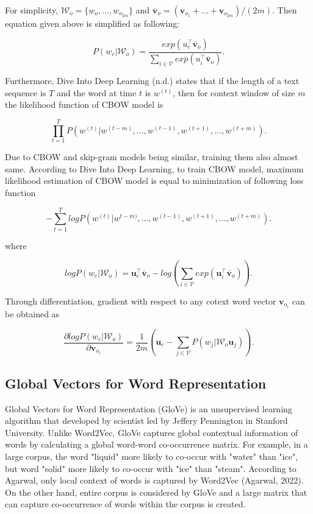 \documentclass[man]{apa7}
\begin{document}
For simplicity, $\mathcal{W}_o = \{ w_o,...,w_{o_{2m}}\}$ and $\bar{\mathbf{v}}_o = (\mathbf{v}_{o_1}+...+\mathbf{v}_{o_{2m}})/(2m)$. Then equation given above is simplified as following:

\begin{equation}
P(w_c | \mathcal{W}_o) = \frac{exp(u_c^\top \bar{\mathbf{v}}_o)}{\sum_{i \in \mathcal{V}} exp(u_i^\top \bar{\mathbf{v}}_o)}.
\end{equation}

Furthermore, Dive Into Deep Learning (n.d.) states that if the length of a text sequence is $\mathit{T}$ and the word at time $t$ is $w^{(t)}$, then for context window of size $m$ the likelihood function of CBOW model is

\begin{equation}
\prod_{t=1}^T P(w^{(t)}| w^{(t-m)},..., w^{(t-1)},w^{(t+1)},...,w^{(t+m)}).
\end{equation}

Due to CBOW and skip-gram models being similar, training them also almost same. According to Dive Into Deep Learning, to train CBOW model, maximum likelihood estimation of CBOW model is equal to minimization of following loss function

\begin{equation}
- \sum_{t=1}^T logP(w^{(t)} | w^{t-m)} ,..., w^{(t-1)} ,w^{(t+1)}, ...,w^{(t+m)}).
\end{equation}

where

\begin{equation}
logP(w_c | \mathcal{W}_o) = \mathbf{u}_c^\top \bar{\mathbf{v}}_o - log(\sum_{i \in \mathcal{V}} exp(\mathbf{u}_i^\top \bar{\mathbf{v}}_o)).
\end{equation}

Through differentiation, gradient with respect to any cotext word vector $\mathbf{v}_{o_i}$ can be obtained as

\begin{equation}
\frac{\partial log P(w_c| \mathcal{W}_o )}{\partial \mathbf{v}_{o_i}} = \frac{1}{2m}(\mathbf{u}_c - \sum_{j \in \mathcal{V}} P(w_j| \mathcal{W}_o \mathbf{u}_j)).
\end{equation}

\subsection{Global Vectors for Word Representation}

Global Vectors for Word Representation (GloVe) is an unsupervised learning algorithm that developed by scientist led by Jeffery Pennington in Stanford University. Unlike Word2Vec, GloVe captures global contextual information of words by calculating a global word-word co-occurrence matrix. For example, in a large corpus, the word "liquid" more likely to co-occur with "water" than "ice", but word "solid" more likely to co-occur with "ice" than "steam". According to Agarwal, only local context of words is captured by Word2Vec (Agarwal, 2022). On the other hand, entire corpus is considered by GloVe and a large matrix that can capture co-occurrence of words within the corpus is created.
\\[2\baselineskip]
\end{document}
